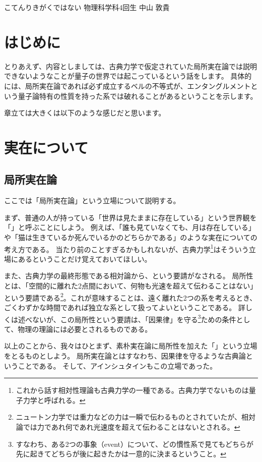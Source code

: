 \documentclass[10pt,b5paper,papersize,dvipdfmx]{jsbook}
\begin{document}

\kaishititle%
  {こてんりきがくではない}%
  {物理科学科4回生}%
  {中山 敦貴}%

\setcounter{tocdepth}{2} %
\tableofcontents %
\clearpage %


\section*{はじめに}
とりあえず、内容としましては、古典力学で仮定されていた局所実在論では説明できないようなことが量子の世界では起こっているという話をします。
具体的には、局所実在論であれば必ず成立するベルの不等式が、エンタングルメントという量子論特有の性質を持った系では破れることがあるということを示します。\par
章立ては大きくは以下のような感じだと思います。


\section{実在について}

%
\subsection{局所実在論}

ここでは「局所実在論」という立場について説明する。
\par
まず、普通の人が持っている「世界は見たままに存在している」という世界観を「」と呼ぶことにしよう。
例えば、「誰も見ていなくても、月は存在している」や「猫は生きているか死んでいるかのどちらかである」のような実在についての考え方である。
当たり前のことすぎるかもしれないが、古典力学\footnote{
  これから話す相対性理論も古典力学の一種である。古典力学でないものは量子力学と呼ばれる。
}はそういう立場にあるということだけ覚えておいてほしい。
\par
また、古典力学の最終形態である相対論から、という要請がなされる。
局所性とは、「空間的に離れた2点間において、何物も光速を超えて伝わることはない」という要請である\footnote{
  ニュートン力学では重力などの力は一瞬で伝わるものとされていたが、相対論では力であれ何であれ光速度を超えて伝わることはないとされる。
}。これが意味することは、遠く離れた2つの系を考えるとき、ごくわずかな時間であれば独立な系として扱ってよいということである。
詳しくは述べないが、この局所性という要請は、「因果律」を守る\footnote{
  すなわち、ある2つの事象（event）について、どの慣性系で見てもどちらが先に起きてどちらが後に起きたかは一意的に決まるということ。
}ための条件として、物理の理論には必要とされるものである。
\par
以上のことから、我々はひとまず、素朴実在論に局所性を加えた「」という立場をとるものとしよう。
局所実在論とはすなわち、因果律を守るような古典論ということである。
そして、アインシュタインもこの立場であった。
\end{document}
